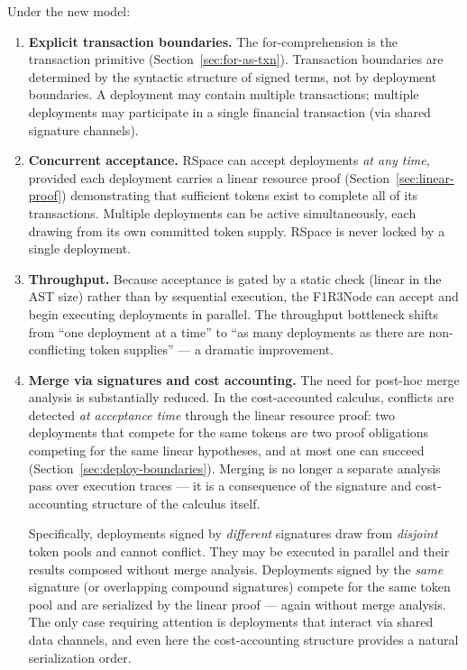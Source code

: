 \documentclass[11pt,a4paper]{article}
\begin{document}
Under the new model:
\begin{enumerate}[label=(\roman*)]
  \item \textbf{Explicit transaction boundaries.}  The
    for-comprehension is the transaction primitive
    (Section~\ref{sec:for-as-txn}).  Transaction boundaries
    are determined by the syntactic structure of signed terms,
    not by deployment boundaries.  A deployment may contain
    multiple transactions; multiple deployments may
    participate in a single financial transaction (via shared
    signature channels).

  \item \textbf{Concurrent acceptance.}  RSpace can accept
    deployments \emph{at any time}, provided each deployment
    carries a linear resource proof
    (Section~\ref{sec:linear-proof}) demonstrating that
    sufficient tokens exist to complete all of its
    transactions.  Multiple deployments can be active
    simultaneously, each drawing from its own committed token
    supply.  RSpace is never locked by a single deployment.

  \item \textbf{Throughput.}  Because acceptance is gated by a
    static check (linear in the AST size) rather than by
    sequential execution, the F1R3Node can accept and begin
    executing deployments in parallel.  The throughput
    bottleneck shifts from ``one deployment at a time'' to
    ``as many deployments as there are non-conflicting token
    supplies'' --- a dramatic improvement.

  \item \textbf{Merge via signatures and cost accounting.}
    The need for post-hoc merge analysis is substantially
    reduced.  In the cost-accounted calculus, conflicts are
    detected \emph{at acceptance time} through the linear
    resource proof: two deployments that compete for the same
    tokens are two proof obligations competing for the same
    linear hypotheses, and at most one can succeed
    (Section~\ref{sec:deploy-boundaries}).  Merging is no
    longer a separate analysis pass over execution traces ---
    it is a consequence of the signature and cost-accounting
    structure of the calculus itself.

    Specifically, deployments signed by \emph{different}
    signatures draw from \emph{disjoint} token pools and
    cannot conflict.  They may be executed in parallel and
    their results composed without merge analysis.
    Deployments signed by the \emph{same} signature (or
    overlapping compound signatures) compete for the same
    token pool and are serialized by the linear proof ---
    again without merge analysis.  The only case requiring
    attention is deployments that interact via shared
    data channels, and even here the cost-accounting
    structure provides a natural serialization order.
\end{enumerate}
\end{document}
